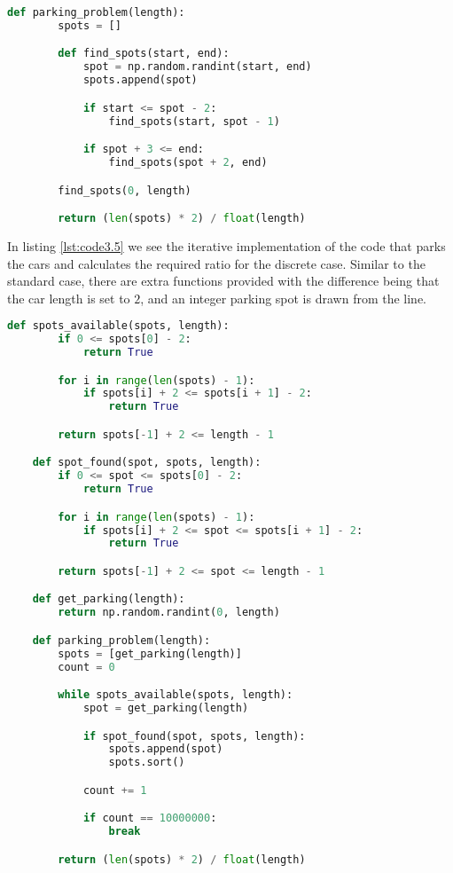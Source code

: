 \begin{lstlisting}[language=python,caption=Parking Problem - Recursive - discrete case,label=lst:code3]
	def parking_problem(length):
		spots = []

		def find_spots(start, end):
			spot = np.random.randint(start, end)
			spots.append(spot)

			if start <= spot - 2:
				find_spots(start, spot - 1)

			if spot + 3 <= end:
				find_spots(spot + 2, end)

		find_spots(0, length)

		return (len(spots) * 2) / float(length)

\end{lstlisting}  \bigskip

In listing \ref{lst:code3.5} we see the iterative implementation of the code 
that parks the cars and calculates the required ratio for the discrete case. 
Similar to the standard case, there are extra functions provided with the 
difference being that the car length is set to $2$, and an integer parking 
spot is drawn from the line. \bigskip

\begin{lstlisting}[language=python,caption=Parking Problem - Iterative - discrete case,label=lst:code3.5]
	def spots_available(spots, length):
		if 0 <= spots[0] - 2:
			return True

		for i in range(len(spots) - 1):
			if spots[i] + 2 <= spots[i + 1] - 2:
				return True

		return spots[-1] + 2 <= length - 1

	def spot_found(spot, spots, length):
		if 0 <= spot <= spots[0] - 2:
			return True

		for i in range(len(spots) - 1):
			if spots[i] + 2 <= spot <= spots[i + 1] - 2:
				return True

		return spots[-1] + 2 <= spot <= length - 1

	def get_parking(length):
		return np.random.randint(0, length)

	def parking_problem(length):
		spots = [get_parking(length)]
		count = 0

		while spots_available(spots, length):
			spot = get_parking(length)

			if spot_found(spot, spots, length):
				spots.append(spot)
				spots.sort()

			count += 1

			if count == 10000000:
				break

		return (len(spots) * 2) / float(length)

\end{lstlisting}  \bigskip

